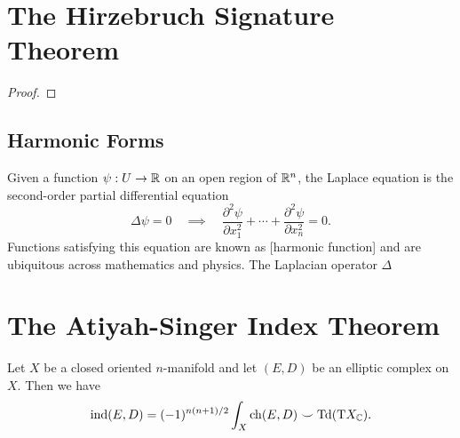 
\section{The Hirzebruch Signature Theorem}

\begin{theorem}\label{thm:hirzebruch_signature}
\end{theorem}

\begin{proof}
\end{proof}

\subsection*{Harmonic Forms}

Given a function $\psi : U \to \mathbb{R}$ on an open region of $\mathbb{R}^n$, the Laplace equation is the second-order partial differential equation
\begin{equation}\label{eq:laplace}
    \Delta \psi = 0
    \quad\implies\quad
    \frac{\partial^2 \psi}{\partial x_1^2}+\cdots+\frac{\partial^2 \psi}{\partial x_n^2}=0.
\end{equation}
Functions satisfying this equation are known as [harmonic function] and are ubiquitous across mathematics and physics. The Laplacian operator $\Delta$

\section{The Atiyah-Singer Index Theorem}

\begin{theorem}\label{thm:atiyah-singer_index}
  Let $X$ be a closed oriented $n$-manifold and let $(E,D)$ be an elliptic complex on $X$. Then we have
  \[
    \operatorname{\operatorname{ind}}(E, D) = (-1)^{n(n+1)/2}\int_X \mathrm{ch}(E,D)\smile \operatorname{\operatorname{Td}}(\mathrm{T} X_{\mathbb{C}}).
  \]
\end{theorem}
